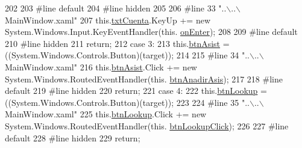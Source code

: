 \begin{DoxyCode}
202             
203 \textcolor{preprocessor}{            #line default}
204 \textcolor{preprocessor}{}\textcolor{preprocessor}{            #line hidden}
205 \textcolor{preprocessor}{}            
206 \textcolor{preprocessor}{            #line 33 "..\(\backslash\)..\(\backslash\)MainWindow.xaml"}
207 \textcolor{preprocessor}{}            this.\hyperlink{class_asistencias__wpf_1_1_main_window_a52e76fc15be974c00138b13ab7e19b44}{txtCuenta}.KeyUp += \textcolor{keyword}{new} System.Windows.Input.KeyEventHandler(this.
      \hyperlink{class_asistencias__wpf_1_1_main_window_af5e3f09d78ecb240a880e737454e1246}{onEnter});
208             
209 \textcolor{preprocessor}{            #line default}
210 \textcolor{preprocessor}{}\textcolor{preprocessor}{            #line hidden}
211 \textcolor{preprocessor}{}            \textcolor{keywordflow}{return};
212             \textcolor{keywordflow}{case} 3:
213             this.\hyperlink{class_asistencias__wpf_1_1_main_window_a65c34d321ad5d831ae14e80205d153b8}{btnAsist} = ((System.Windows.Controls.Button)(target));
214             
215 \textcolor{preprocessor}{            #line 34 "..\(\backslash\)..\(\backslash\)MainWindow.xaml"}
216 \textcolor{preprocessor}{}            this.\hyperlink{class_asistencias__wpf_1_1_main_window_a65c34d321ad5d831ae14e80205d153b8}{btnAsist}.Click += \textcolor{keyword}{new} System.Windows.RoutedEventHandler(this.
      \hyperlink{class_asistencias__wpf_1_1_main_window_ae82807e4848c98f05418df82f3da7159}{btnAnadirAsis});
217             
218 \textcolor{preprocessor}{            #line default}
219 \textcolor{preprocessor}{}\textcolor{preprocessor}{            #line hidden}
220 \textcolor{preprocessor}{}            \textcolor{keywordflow}{return};
221             \textcolor{keywordflow}{case} 4:
222             this.\hyperlink{class_asistencias__wpf_1_1_main_window_a06d0d015783f1332649608fd2a84d459}{btnLookup} = ((System.Windows.Controls.Button)(target));
223             
224 \textcolor{preprocessor}{            #line 35 "..\(\backslash\)..\(\backslash\)MainWindow.xaml"}
225 \textcolor{preprocessor}{}            this.\hyperlink{class_asistencias__wpf_1_1_main_window_a06d0d015783f1332649608fd2a84d459}{btnLookup}.Click += \textcolor{keyword}{new} System.Windows.RoutedEventHandler(this.
      \hyperlink{class_asistencias__wpf_1_1_main_window_a0e869f220f887ff19bf34d09aee597c1}{btnLookupClick});
226             
227 \textcolor{preprocessor}{            #line default}
228 \textcolor{preprocessor}{}\textcolor{preprocessor}{            #line hidden}
229 \textcolor{preprocessor}{}            \textcolor{keywordflow}{return};

\end{DoxyCode}

